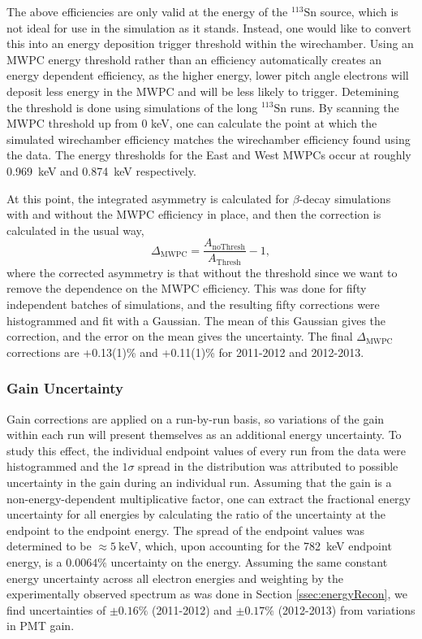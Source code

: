 The above efficiencies are only valid at the energy of the $^{113}\mathrm{Sn}$ source,
which is not ideal for use in the simulation as it stands.
Instead, one would
like to convert this into an energy deposition trigger threshold within the wirechamber.
Using an MWPC energy threshold rather than an efficiency
automatically creates an energy dependent efficiency, as the higher energy, lower pitch angle
electrons will deposit less energy in the MWPC and will be less likely to trigger.
Detemining the threshold is done using 
simulations of the long $^{113}\mathrm{Sn}$ runs. By scanning the MWPC threshold up from 0 keV, one can
calculate the point at which the simulated wirechamber efficiency matches the wirechamber
efficiency found using the data. The energy thresholds for the East and West
MWPCs occur at roughly 0.969~keV and 0.874~keV respectively.

At this point, the integrated asymmetry is calculated for $\beta$-decay simulations with and without
the MWPC efficiency in place, and then the correction is calculated in the usual way,
\begin{equation}
  \Delta_{\mathrm{MWPC}} = \frac{A_{\mathrm{noThresh}}}{A_{\mathrm{Thresh}}}-1, 
\end{equation}
%
\noindent where the corrected asymmetry is that without the threshold since we want to remove
the dependence on the MWPC efficiency. This was done for fifty independent batches of simulations,
and the resulting fifty corrections were histogrammed and fit with a Gaussian. The mean of this Gaussian
gives the correction, and the error on the mean gives the uncertainty.
The final $\Delta_{\mathrm{MWPC}}$ corrections are +0.13(1)\% and +0.11(1)\% for 2011-2012 and 2012-2013. 


\subsubsection{Gain Uncertainty}

Gain corrections are applied on a run-by-run basis, so variations
of the gain within each run will present themselves as an additional
energy uncertainty. To study this effect, the individual endpoint values
of every run from the data were histogrammed and the $1\sigma$ spread in
the distribution was attributed to possible uncertainty in the gain during
an individual run. Assuming that the gain is a non-energy-dependent
multiplicative factor,
one can extract the
fractional energy uncertainty for all energies by calculating the ratio
of the uncertainty at the endpoint to the endpoint energy.
The spread of the endpoint values
was determined to be $\approx 5~\mathrm{keV}$, which, upon accounting for the 782~keV endpoint
energy,
is a $0.0064\%$ uncertainty on the energy. Assuming the same constant energy
uncertainty across all electron energies and weighting by the experimentally observed
spectrum as was done in Section \ref{ssec:energyRecon}, we find uncertainties 
of $\pm0.16\%$ (2011-2012) and $\pm0.17\%$ (2012-2013) from variations in PMT gain.


